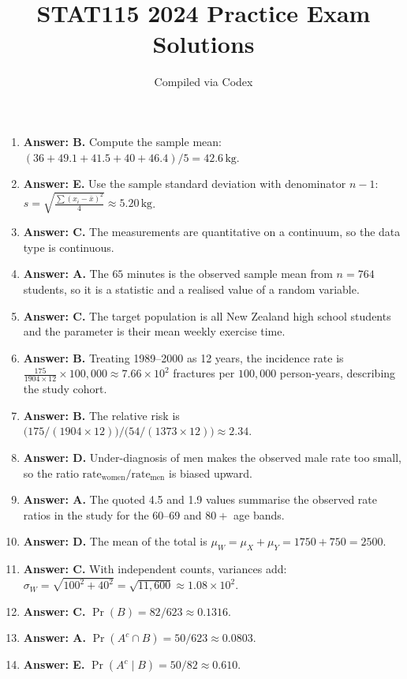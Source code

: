 \documentclass[11pt]{article}
\title{STAT115 2024 Practice Exam Solutions}
\author{Compiled via Codex}
\date{}
\begin{document}
\maketitle

\begin{enumerate}[label=\textbf{Q\arabic*:}, leftmargin=*, itemsep=0.9em]
\item \textbf{Answer: B.} Compute the sample mean: $(36 + 49.1 + 41.5 + 40 + 46.4)/5 = 42.6\,\text{kg}$.
\item \textbf{Answer: E.} Use the sample standard deviation with denominator $n-1$: $s = \sqrt{\frac{\sum (x_i - \bar{x})^2}{4}} \approx 5.20\,\text{kg}$.
\item \textbf{Answer: C.} The measurements are quantitative on a continuum, so the data type is continuous.
\item \textbf{Answer: A.} The $65$ minutes is the observed sample mean from $n=764$ students, so it is a statistic and a realised value of a random variable.
\item \textbf{Answer: C.} The target population is all New Zealand high school students and the parameter is their mean weekly exercise time.
\item \textbf{Answer: B.} Treating 1989--2000 as 12 years, the incidence rate is $\frac{175}{1904\times 12}\times 100{,}000 \approx 7.66\times 10^2$ fractures per $100{,}000$ person-years, describing the study cohort.
\item \textbf{Answer: B.} The relative risk is $\big(175/(1904\times 12)\big)\big/\big(54/(1373\times 12)\big) \approx 2.34$.
\item \textbf{Answer: D.} Under-diagnosis of men makes the observed male rate too small, so the ratio $\text{rate}_\text{women}/\text{rate}_\text{men}$ is biased upward.
\item \textbf{Answer: A.} The quoted 4.5 and 1.9 values summarise the observed rate ratios in the study for the 60--69 and $80+$ age bands.
\item \textbf{Answer: D.} The mean of the total is $\mu_W = \mu_X + \mu_Y = 1750 + 750 = 2500$.
\item \textbf{Answer: C.} With independent counts, variances add: $\sigma_W = \sqrt{100^2 + 40^2} = \sqrt{11{,}600} \approx 1.08\times 10^2$.
\item \textbf{Answer: C.} $\Pr(B) = 82/623 \approx 0.1316$.
\item \textbf{Answer: A.} $\Pr(A^c \cap B) = 50/623 \approx 0.0803$.
\item \textbf{Answer: E.} $\Pr(A^c \mid B) = 50/82 \approx 0.610$.

\end{enumerate}
\end{document}
